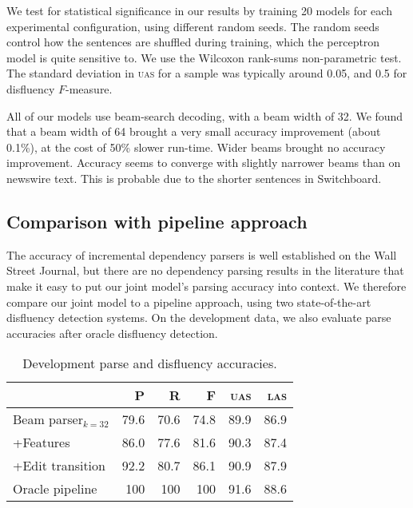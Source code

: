 \documentclass[11pt,letterpaper]{article}
\begin{document}
We test for statistical significance in our results by training 20 models for
each experimental configuration, using different random seeds. The random seeds
control how the sentences are shuffled during training, which the perceptron
model is quite sensitive to.  We use the Wilcoxon rank-sums non-parametric test.
The standard deviation in \textsc{uas} for a sample was typically around 0.05,
and 0.5 for disfluency $F$-measure.

All of our models use beam-search decoding, with a beam width of 32. We found that
a beam width of 64 brought a very small accuracy improvement (about 0.1\%), at
the cost of 50\% slower run-time. Wider beams brought no accuracy improvement.
Accuracy seems to converge with slightly narrower beams than on newswire text.
This is probable due to the shorter sentences in Switchboard.


\subsection{Comparison with pipeline approach}
\label{sec:pipeline}
The accuracy of incremental dependency parsers is well established on the Wall
Street Journal, but there are no dependency parsing results in the literature
that make it easy to put our joint model's parsing accuracy into context.
We therefore compare our joint model to a pipeline approach, using two state-of-the-art
disfluency detection systems. On the development data, we also evaluate parse
accuracies after oracle disfluency detection.

\begin{table}
    \centering
    \small
    \begin{tabular}{l|rrr|rr}
        & P & R & F & \textsc{uas} & \textsc{las} \\
        \hline \hline
Beam parser$_{k=32}$  &	79.6	&	70.6	&	74.8	&	89.9	&	86.9 \\
+Features             &	86.0	&	77.6	&	81.6	&	90.3	&	87.4 \\
+Edit transition      &	92.2	&	80.7	&	86.1	&	90.9	&	87.9 \\
\hline       
Oracle pipeline  & 100 & 100 & 100 & 91.6    & 88.6 \\
\hline
    \end{tabular}
\caption{Development parse and disfluency accuracies.
\label{tab:dev}}
\end{table}
\end{document}
